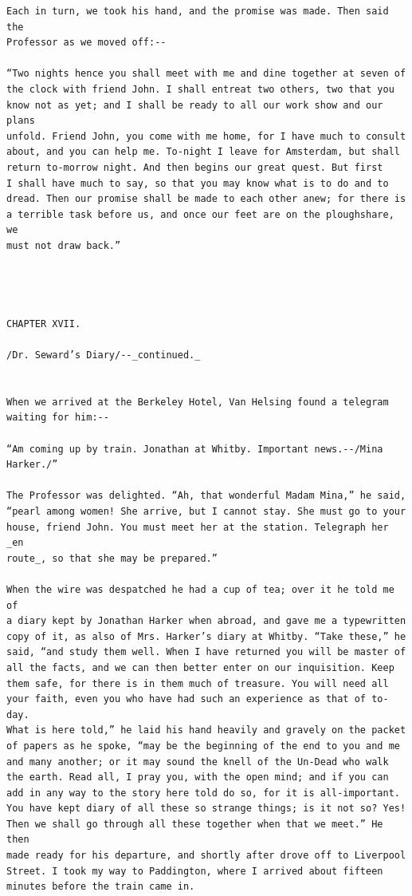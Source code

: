 \documentclass{article}
\begin{document}
\begin{verbatim}
Each in turn, we took his hand, and the promise was made. Then said the
Professor as we moved off:--

“Two nights hence you shall meet with me and dine together at seven of
the clock with friend John. I shall entreat two others, two that you
know not as yet; and I shall be ready to all our work show and our plans
unfold. Friend John, you come with me home, for I have much to consult
about, and you can help me. To-night I leave for Amsterdam, but shall
return to-morrow night. And then begins our great quest. But first
I shall have much to say, so that you may know what is to do and to
dread. Then our promise shall be made to each other anew; for there is
a terrible task before us, and once our feet are on the ploughshare, we
must not draw back.”




CHAPTER XVII.

/Dr. Seward’s Diary/--_continued._


When we arrived at the Berkeley Hotel, Van Helsing found a telegram
waiting for him:--

“Am coming up by train. Jonathan at Whitby. Important news.--/Mina
Harker./”

The Professor was delighted. “Ah, that wonderful Madam Mina,” he said,
“pearl among women! She arrive, but I cannot stay. She must go to your
house, friend John. You must meet her at the station. Telegraph her _en
route_, so that she may be prepared.”

When the wire was despatched he had a cup of tea; over it he told me of
a diary kept by Jonathan Harker when abroad, and gave me a typewritten
copy of it, as also of Mrs. Harker’s diary at Whitby. “Take these,” he
said, “and study them well. When I have returned you will be master of
all the facts, and we can then better enter on our inquisition. Keep
them safe, for there is in them much of treasure. You will need all
your faith, even you who have had such an experience as that of to-day.
What is here told,” he laid his hand heavily and gravely on the packet
of papers as he spoke, “may be the beginning of the end to you and me
and many another; or it may sound the knell of the Un-Dead who walk
the earth. Read all, I pray you, with the open mind; and if you can
add in any way to the story here told do so, for it is all-important.
You have kept diary of all these so strange things; is it not so? Yes!
Then we shall go through all these together when that we meet.” He then
made ready for his departure, and shortly after drove off to Liverpool
Street. I took my way to Paddington, where I arrived about fifteen
minutes before the train came in.


\end{verbatim}
\end{document}
